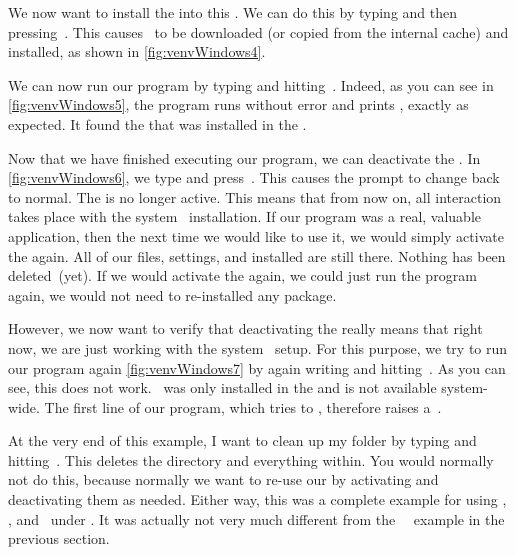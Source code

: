 We now want to install the \numpy{}  into this .
We can do this by typing  and then pressing~\keys{\return}.
This causes \numpy\ to be downloaded (or copied from the internal cache) and installed, as shown in \cref{fig:venvWindows4}.%
%
\begin{sloppypar}%
We can now run our program  by typing  and hitting~\keys{\return}.
Indeed, as you can see in \cref{fig:venvWindows5}, the program runs without error and prints , exactly as expected.
It found the \numpy{}  that was installed in the .%
\end{sloppypar}%
%
Now that we have finished executing our program, we can deactivate the .
In \cref{fig:venvWindows6}, we type  and press~\keys{\return}.
This causes the prompt to change back to normal.
The  is no longer active.
This means that from now on, all interaction takes place with the system \python\ installation.
If our program was a real, valuable application, then the next time we would like to use it, we would simply activate the  again.
All of our files, settings, and installed  are still there.
Nothing has been deleted~(yet).
If we would activate the  again, we could just run the program again, we would not need to re-installed any package.

However, we now want to verify that deactivating the  really means that right now, we are just working with the system \python\ setup.
For this purpose, we try to run our program again \cref{fig:venvWindows7} by again writing  and hitting~\keys{\return}.
As you can see, this does not work.
\numpy\ was only installed in the  and is not available system-wide.
The first line of our program, which tries to , therefore raises a~.

At the very end of this example, I want to clean up my folder by typing  and hitting~\keys{\return}.
This deletes the directory  and everything within.
You would normally not do this, because normally we want to re-use our  by activating and deactivating them as needed.
Either way, this was a complete example for using , \pip, and \venv\ under \windows.
It was actually not very much different from the \ubuntu\ \linux\ example in the previous section.%
%
\endhsection%
%
\FloatBarrier
%
\endhsection%
%

